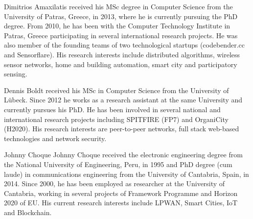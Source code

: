 \documentclass[journal]{IEEEtran}
\begin{document}


\vspace{-10ex}
\begin{IEEEbiography}{Dimitrios Amaxilatis}
received his MSc degree in Computer Science from the University of Patras, Greece, in 2013, where he is currently pursuing the PhD degree. From 2010, he has been with the Computer Technology Institute in Patras, Greece participating in several international research projects. He was also member of the founding teams of two technological startups (codebender.cc and Sensorflare). His research interests include distributed algorithms, wireless sensor networks, home and building automation, smart city and participatory sensing.
\end{IEEEbiography}
\vspace{-7ex}
\begin{IEEEbiography}{Dennis Boldt}
received his MSc in Computer Science from the University of L{\"u}beck. Since 2012 he works as a research assistant at the same University and currently pursues his PhD.
He has been involved in several national and international research projects including SPITFIRE (FP7) and OrganiCity (H2020).
His research interests are peer-to-peer networks, full stack web-based technologies and network security.
\end{IEEEbiography}
\vspace{-7ex}
\begin{IEEEbiography}{Johnny Choque}
Johnny Choque received the electronic engineering degree from the National University of Engineering, Peru, in 1995 and PhD degree (cum laude) in communications engineering from the University of Cantabria, Spain, in 2014. Since 2000, he has been employed as researcher at the University of Cantabria, working in several projects of Framework Programme and Horizon 2020 of EU. His current research interests include LPWAN, Smart Cities, IoT and Blockchain.
\end{IEEEbiography}
\end{document}
